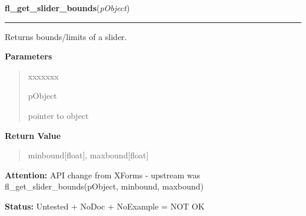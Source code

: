 \hspace{.8\funcindent}\begin{boxedminipage}{\funcwidth}

    \raggedright \textbf{fl\_get\_slider\_bounds}(\textit{pObject})

    \vspace{-1.5ex}

    \rule{\textwidth}{0.5\fboxrule}
\setlength{\parskip}{2ex}
    Returns bounds/limits of a slider.

\setlength{\parskip}{1ex}
      \textbf{Parameters}
      \vspace{-1ex}

      \begin{quote}
        \begin{Ventry}{xxxxxxx}

          \item[pObject]

          pointer to object

        \end{Ventry}

      \end{quote}

      \textbf{Return Value}
    \vspace{-1ex}

      \begin{quote}
      minbound[float], maxbound[float]

      \end{quote}

\textbf{Attention:} API change from XForms - upstream was fl\_get\_slider\_bounds(pObject, 
minbound, maxbound)



\textbf{Status:} Untested + NoDoc + NoExample = NOT OK



    \end{boxedminipage}

    \label{xformslib:library:fl_set_slider_return}

    \vspace{0.5ex}

